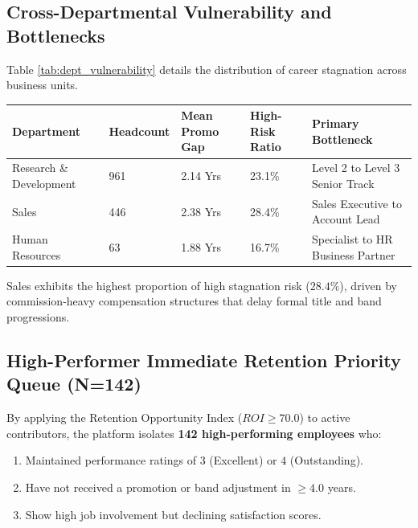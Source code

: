 \documentclass[12pt,a4paper,oneside]{article}
\begin{document}
\subsection{Cross-Departmental Vulnerability and Bottlenecks}
Table \ref{tab:dept_vulnerability} details the distribution of career stagnation across business units.

\begin{center}
\fontsize{9}{11}\selectfont
\begin{tabular}{|L{3.4cm}|C{2.0cm}|C{2.4cm}|C{2.4cm}|L{4.0cm}|}
\hline
\textbf{Department} & \textbf{Headcount} & \textbf{Mean Promo Gap} & \textbf{High-Risk Ratio} & \textbf{Primary Bottleneck} \\ \hline
Research \& Development & 961 & 2.14 Yrs & 23.1\% & Level 2 to Level 3 Senior Track \\ \hline
Sales & 446 & 2.38 Yrs & 28.4\% & Sales Executive to Account Lead \\ \hline
Human Resources & 63 & 1.88 Yrs & 16.7\% & Specialist to HR Business Partner \\ \hline
\end{tabular}
\vspace{0.02in}
\label{tab:dept_vulnerability}
\end{center}

Sales exhibits the highest proportion of high stagnation risk ($28.4\%$), driven by commission-heavy compensation structures that delay formal title and band progressions.

\subsection{High-Performer Immediate Retention Priority Queue (N=142)}
By applying the Retention Opportunity Index ($ROI \ge 70.0$) to active contributors, the platform isolates \textbf{142 high-performing employees} who:
\begin{enumerate}
  \item Maintained performance ratings of $3$ (Excellent) or $4$ (Outstanding).
  \item Have not received a promotion or band adjustment in $\ge 4.0$ years.
  \item Show high job involvement but declining satisfaction scores.
\end{enumerate}
\end{document}
